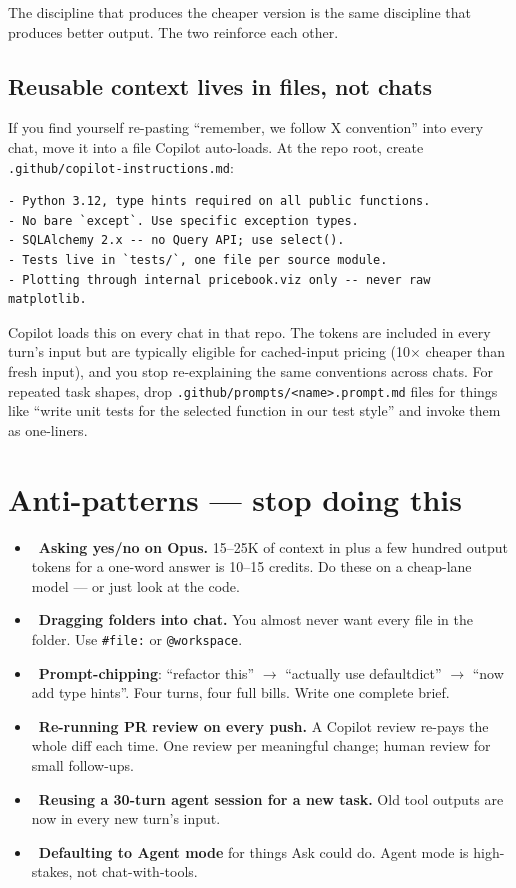 \documentclass[11pt,a4paper]{article}
\newcommand{\no}{\textcolor{warningred}{\ding{55}}}
\begin{document}
\noindent The discipline that produces the cheaper version is the same discipline that produces better output. The two reinforce each other.

\subsection*{Reusable context lives in files, not chats}

If you find yourself re-pasting ``remember, we follow X convention'' into every chat, move it into a file Copilot auto-loads. At the repo root, create \texttt{.github/copilot-instructions.md}:

\begin{lstlisting}
- Python 3.12, type hints required on all public functions.
- No bare `except`. Use specific exception types.
- SQLAlchemy 2.x -- no Query API; use select().
- Tests live in `tests/`, one file per source module.
- Plotting through internal pricebook.viz only -- never raw matplotlib.
\end{lstlisting}

\noindent Copilot loads this on every chat in that repo. The tokens are included in every turn's input but are typically eligible for cached-input pricing (10$\times$ cheaper than fresh input), and you stop re-explaining the same conventions across chats. For repeated task shapes, drop \texttt{.github/prompts/<name>.prompt.md} files for things like ``write unit tests for the selected function in our test style'' and invoke them as one-liners.

\section{Anti-patterns --- stop doing this}\label{sec:antipatterns}

\begin{itemize}
  \item \no~\textbf{Asking yes/no on Opus.} 15--25K of context in plus a few hundred output tokens for a one-word answer is 10--15 credits. Do these on a cheap-lane model --- or just look at the code.
  \item \no~\textbf{Dragging folders into chat.} You almost never want every file in the folder. Use \texttt{\#file:} or \texttt{@workspace}.
  \item \no~\textbf{Prompt-chipping}: ``refactor this'' $\rightarrow$ ``actually use defaultdict'' $\rightarrow$ ``now add type hints''. Four turns, four full bills. Write one complete brief.
  \item \no~\textbf{Re-running PR review on every push.} A Copilot review re-pays the whole diff each time. One review per meaningful change; human review for small follow-ups.
  \item \no~\textbf{Reusing a 30-turn agent session for a new task.} Old tool outputs are now in every new turn's input.
  \item \no~\textbf{Defaulting to Agent mode} for things Ask could do. Agent mode is high-stakes, not chat-with-tools.
\end{itemize}
\end{document}
